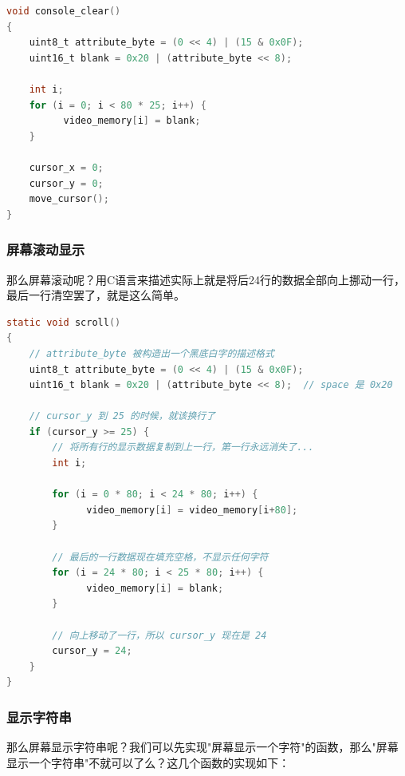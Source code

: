 \begin{lstlisting}[language = C, caption = drivers/console.c]
void console_clear()
{
	uint8_t attribute_byte = (0 << 4) | (15 & 0x0F);
	uint16_t blank = 0x20 | (attribute_byte << 8);

	int i;
	for (i = 0; i < 80 * 25; i++) {
	      video_memory[i] = blank;
	}

	cursor_x = 0;
	cursor_y = 0;
	move_cursor();
}
\end{lstlisting}

\subsubsection{屏幕滚动显示}

\par 那么屏幕滚动呢？用C语言来描述实际上就是将后24行的数据全部向上挪动一行，最后一行清空罢了，就是这么简单。

\begin{lstlisting}[language = C, caption = drivers/console.c]
static void scroll()
{
	// attribute_byte 被构造出一个黑底白字的描述格式
	uint8_t attribute_byte = (0 << 4) | (15 & 0x0F);
	uint16_t blank = 0x20 | (attribute_byte << 8);  // space 是 0x20

	// cursor_y 到 25 的时候，就该换行了
	if (cursor_y >= 25) {
		// 将所有行的显示数据复制到上一行，第一行永远消失了...
		int i;
		
		for (i = 0 * 80; i < 24 * 80; i++) {
		      video_memory[i] = video_memory[i+80];
		}

		// 最后的一行数据现在填充空格，不显示任何字符
		for (i = 24 * 80; i < 25 * 80; i++) {
		      video_memory[i] = blank;
		}
		
		// 向上移动了一行，所以 cursor_y 现在是 24
		cursor_y = 24;
	}
}
\end{lstlisting}

\subsubsection{显示字符串}

\par 那么屏幕显示字符串呢？我们可以先实现"屏幕显示一个字符"的函数，那么"屏幕显示一个字符串"不就可以了么？这几个函数的实现如下：


